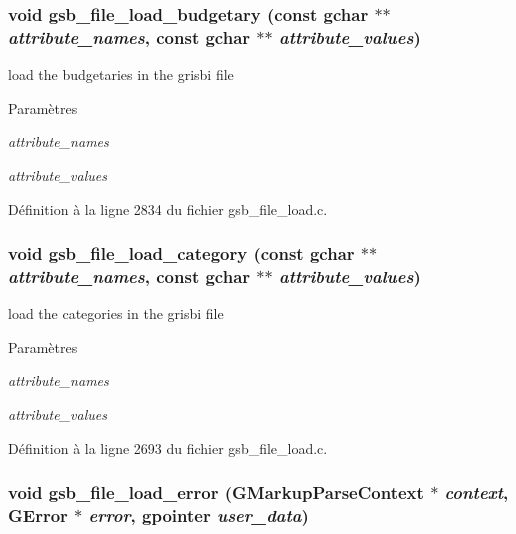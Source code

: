 \subsubsection[{gsb\_\-file\_\-load\_\-budgetary}]{\setlength{\rightskip}{0pt plus 5cm}void gsb\_\-file\_\-load\_\-budgetary (const gchar $\ast$$\ast$ {\em attribute\_\-names}, \/  const gchar $\ast$$\ast$ {\em attribute\_\-values})}\label{gsb__file__load_8c_a8977ebd1f3ba9972e934abdba45cd0db}
load the budgetaries in the grisbi file


\begin{DoxyParams}{Paramètres}
\item[{\em attribute\_\-names}]\item[{\em attribute\_\-values}]\end{DoxyParams}


Définition à la ligne 2834 du fichier gsb\_\-file\_\-load.c.

\subsubsection[{gsb\_\-file\_\-load\_\-category}]{\setlength{\rightskip}{0pt plus 5cm}void gsb\_\-file\_\-load\_\-category (const gchar $\ast$$\ast$ {\em attribute\_\-names}, \/  const gchar $\ast$$\ast$ {\em attribute\_\-values})}\label{gsb__file__load_8c_aa24a461612b4aba269fd1d1cd820f794}
load the categories in the grisbi file


\begin{DoxyParams}{Paramètres}
\item[{\em attribute\_\-names}]\item[{\em attribute\_\-values}]\end{DoxyParams}


Définition à la ligne 2693 du fichier gsb\_\-file\_\-load.c.

\subsubsection[{gsb\_\-file\_\-load\_\-error}]{\setlength{\rightskip}{0pt plus 5cm}void gsb\_\-file\_\-load\_\-error (GMarkupParseContext $\ast$ {\em context}, \/  GError $\ast$ {\em error}, \/  gpointer {\em user\_\-data})}\label{gsb__file__load_8c_a50bcb5608cad0e40b872e97cbc3ceba6}


